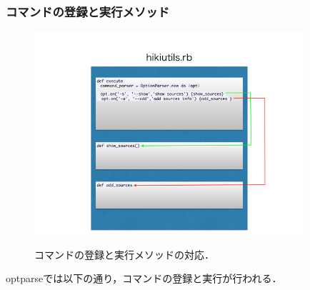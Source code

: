 \subsubsection{コマンドの登録と実行メソッド}
\begin{figure}[htbp]\begin{center}
\includegraphics[width=10cm,bb= 0 0 737 553]{../figs/./hikiutils_yamane.005.jpg}
\caption{コマンドの登録と実行メソッドの対応．}
\label{fig:005}
\label{default}\end{center}\end{figure}
optparseでは以下の通り，コマンドの登録と実行が行われる．

